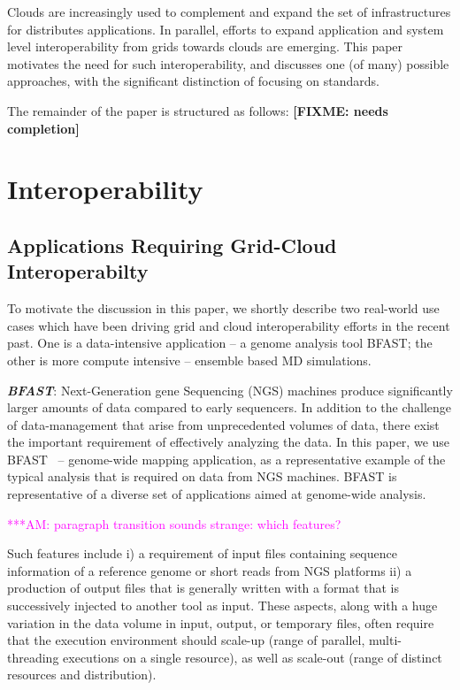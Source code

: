 \documentclass[10pt,conference,final,letterpaper,twoside,twocolumn,]{IEEEtran}
\newcommand{\amnote}[1]{  {\textcolor{magenta} {***AM: #1}}}
\newcommand{\amnote}[1]{}
\newcommand{\I}[1]{\textit{#1}}
\newcommand{\B}[1]{\textbf{#1}}
\newcommand{\BI}[1]{\B{\I{#1}}}
\newcommand{\F}[1]{\B{[FIXME: #1]}}
\begin{document}
 Clouds are increasingly used to complement and expand the set of
 infrastructures for distributes applications.  In parallel, efforts
 to expand application and system level interoperability from grids
 towards clouds are emerging.  This paper motivates the need for such
 interoperability, and discusses one (of many) possible approaches,
 with the significant distinction of focusing on standards.

 The remainder of the paper is structured as follows: \F{needs
 completion}


\section{Interoperability}
\label{sec:interop}

 \subsection*{Applications Requiring Grid-Cloud Interoperabilty}

 To motivate the discussion in this paper, we shortly describe two
 real-world use cases which have been driving grid and cloud
 interoperability efforts in the recent past.  One is a data-intensive
 application -- a genome analysis tool BFAST; the other is more
 compute intensive -- ensemble based MD simulations.
 
 \BI{BFAST}: Next-Generation gene Sequencing (NGS) machines produce
 significantly larger amounts of data compared to early sequencers.
 In addition to the challenge of data-management that arise from
 unprecedented volumes of data, there exist the important requirement
 of effectively analyzing the data.  In this paper, we use
 BFAST~\cite{bfast2009,bfast2009b} -- genome-wide mapping application,
 as a representative example of the typical analysis that is required
 on data from NGS machines.  BFAST is representative of a diverse set
 of applications aimed at genome-wide analysis.
 
 \amnote{paragraph transition sounds strange: which features?}

 Such features include i) a requirement of input files containing
 sequence information of a reference genome or short reads from NGS
 platforms ii) a production of output files that is generally written
 with a format that is successively injected to another tool as input.
 These aspects, along with a huge variation in the data volume in
 input, output, or temporary files, often require that the execution
 environment should scale-up (range of parallel, multi-threading
 executions on a single resource), as well as scale-out (range of
 distinct resources and distribution).
 
\end{document}
